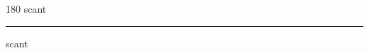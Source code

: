 
\begin{frame}
\begin{center}
\begin{turn}{180}
{\fontsize{2.5cm}{1em}\selectfont scant}
\end{turn}
\vspace{1em}\par  
\hrule
\vspace{1em}\par  
{\fontsize{2.5cm}{1em}\selectfont scant}
\end{center}
\end{frame}
